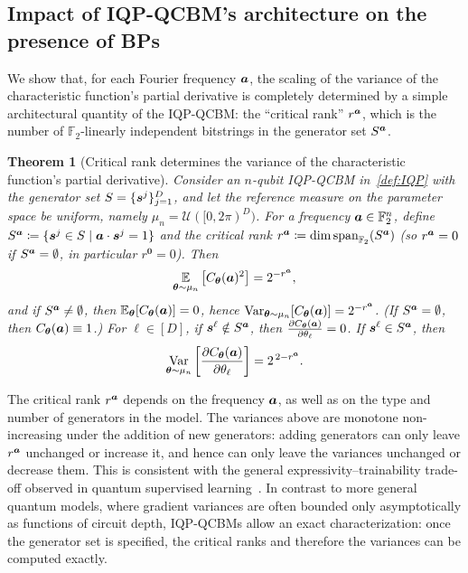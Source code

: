 \documentclass{article}
\theoremstyle{plain}
\newtheorem{theorem}{Theorem}[section]
\theoremstyle{definition}
\theoremstyle{remark}
\begin{document}
\subsection{Impact of IQP-QCBM's architecture on the presence of BPs} \label{subsec:uniform}
We show that, for each Fourier frequency ${\bm{a}}$, the scaling of the variance of the characteristic function's partial derivative is completely determined by a simple architectural quantity of the IQP-QCBM: the ``critical rank'' $r^{\bm{a}}$, which is the number of $\mathbb{F}_2$-linearly independent bitstrings in the generator set $S^{\bm{a}}$.

\begin{theorem}[Critical rank determines the variance of the characteristic function's partial derivative]
\label{thm:uniform}
Consider an $n$-qubit IQP-QCBM in~\cref{def:IQP} with the generator set $S=\{{\bm{s}^j}\}_{j=1}^D$, and let the reference measure on the parameter space be uniform, namely $\mu_n = \mathcal{U}([0,2\pi)^D)$. For a frequency ${\bm{a}} \in \mathbb{F}_2^n$, define $S^{{\bm{a}}} \coloneqq \{ {\bm{s}^j}\in S \mid {\bm{a}} \cdot {\bm{s}^j} = 1 \}$
and the critical rank $r^{\bm{a}} \coloneqq \dim \operatorname{span}_{\mathbb{F}_2}( S^{{\bm{a}}})$
(so $r^{\bm{a}}=0$ if $S^{\bm{a}}=\emptyset$, in particular $r^{\mathbf 0}=0$). Then
\begin{equation}
\operatorname*{\mathbb{E}}_{{\bm{\theta}}\sim\mu_n}\big[C_{\bm{\theta}}({\bm{a}})^2\big] = 2^{-r^{\bm{a}}},
\end{equation}
and if $S^{\bm{a}}\neq\emptyset$, then $\operatorname*{\mathbb{E}}_{{\bm{\theta}}}[C_{\bm{\theta}}({\bm{a}})]=0$, hence
$\operatorname*{Var}_{{\bm{\theta}}\sim\mu_n}[C_{\bm{\theta}}({\bm{a}})] = 2^{-r^{\bm{a}}}$.
(If $S^{\bm{a}}=\emptyset$, then $C_{\bm{\theta}}({\bm{a}})\equiv 1$.) For $\ell \in [D]$, if ${\bm{s}^\ell} \notin S^{\bm{a}}$, then $ \frac{\partial C_{\bm{\theta}}({\bm{a}})}{\partial \theta_\ell}=0$. If ${\bm{s}^\ell} \in S^{\bm{a}}$, then
\begin{equation}
\operatorname*{Var}_{{\bm{\theta}}\sim\mu_n} \left[ \frac{\partial C_{\bm{\theta}}({\bm{a}})}{\partial \theta_\ell} \right] = 2^{\,2-r^{\bm{a}}}. \end{equation}
\end{theorem}

The critical rank $r^{\bm{a}}$ depends on the frequency ${\bm{a}}$, as well as on the type and number of generators in the model. The variances above are monotone non-increasing under the addition of new generators: adding generators can only leave $r^{\bm{a}}$ unchanged or increase it, and hence can only leave the variances unchanged or decrease them. This is consistent with the general expressivity–trainability trade-off observed in quantum supervised learning~\citet{mcclean18, Holmes22}. In contrast to more general quantum models, where gradient variances are often bounded only asymptotically as functions of circuit depth, IQP-QCBMs allow an exact characterization: once the generator set is specified, the critical ranks and therefore the variances can be computed exactly.
\end{document}
